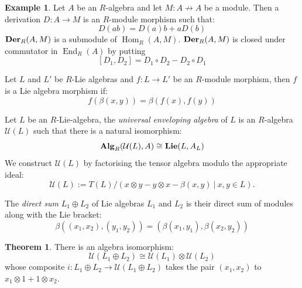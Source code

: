 \documentclass[8pt]{article}
\theoremstyle{definition}
\theoremstyle{definition}
\newtheorem{theorem}{Theorem}[section]
\theoremstyle{definition}
\theoremstyle{definition}
\theoremstyle{definition}
\theoremstyle{definition}
\theoremstyle{definition}
\theoremstyle{definition}
\theoremstyle{definition}
\theoremstyle{definition}
\theoremstyle{definition}
\theoremstyle{definition}
\newtheorem{example}{Example}[section]
\theoremstyle{definition}
\theoremstyle{definition}
\theoremstyle{question}
\begin{document}
\begin{example}
  Let $A$ be an $R$-algebra and let $M : A \not\to A$ be a module. Then a derivation $D : A \to M$
  is an $R$-module morphism such that:
  \[
  D(a b) = D (a) b + a D (b)
  \]
  ${\bf Der}_R(A, M)$ is a submodule of $\operatorname{Hom}_R(A, M)$. ${\bf Der}_R(A, M)$ is closed under
  commutator in $\operatorname{End}_R(A)$ by putting
  \[
  [D_1, D_2] = D_1 \circ D_2 - D_2 \circ D_1
  \]
\end{example}

Let $L$ and $L'$ be $R$-Lie algebras and $f : L \to L'$ be an $R$-module morphism, then 
$f$ is a Lie algebra morphism if:
\[
f (\beta(x, y)) = \beta(f(x), f(y))
\]


Let $L$ be an $R$-Lie-algebra, the \emph{universal enveloping algebra} of $L$ is an $R$-algebra $\mathcal{U}(L)$
such that there is a natural isomorphism:
\[
{\bf Alg}_R(\mathcal{U}(L), A) \cong {\bf Lie}(L, A_L)
\]
We construct $\mathcal{U}(L)$ by factorising the tensor algebra modulo the appropriate ideal:
\[
\mathcal{U}(L) := T(L)/(x \otimes y - y \otimes x - \beta(x, y) \: | \: x, y \in L).
\]

The \emph{direct sum} $L_1 \oplus L_2$ of Lie algebras $L_1$ and $L_2$ is their direct sum of modules
along with the Lie bracket:
\[
\beta((x_1, x_2), (y_1, y_2)) = (\beta(x_1, y_1), \beta(x_2, y_2))
\]

\begin{theorem}
  There is an algebra isomorphism:
  \[
  \mathcal{U}(L_1 \oplus L_2) \cong \mathcal{U}(L_1) \otimes \mathcal{U}(L_2)
  \]
  whose composite $i : L_1 \oplus L_2 \to \mathcal{U}(L_1 \oplus L_2)$ takes the pair 
  $(x_1, x_2)$ to $x_1 \otimes 1 + 1 \otimes x_2$.
\end{theorem}
\end{document}
